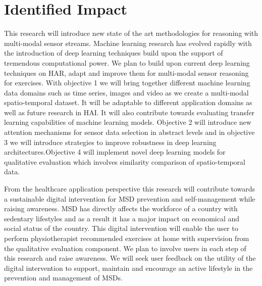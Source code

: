 \section{Identified Impact}

This research will introduce new state of the art methodologies for reasoning with multi-modal sensor streams. Machine learning research has evolved rapidly with the introduction of deep learning techniques build upon the support of tremendous computational power. We plan to build upon current deep learning techniques on HAR, adapt and improve them for multi-modal sensor reasoning for exercises. With objective 1 we will bring together different machine learning data domains such as time series, images and video as we create a multi-modal spatio-temporal dataset. It will be adaptable to different application domains as well as future research in HAI. It will also contribute towards evaluating transfer learning capabilities of machine learning models. Objective 2 will introduce new attention mechanisms for sensor data selection in abstract levels and in objective 3 we will introduce strategies to improve robustness in deep learning architectures.Objective 4 will implement novel deep learning models for qualitative evaluation which involves similarity comparison of spatio-temporal data. 

From the healthcare application perspective this research will contribute towards a sustainable digital intervention for MSD prevention and self-management while raising awareness. MSD has directly affects the workforce of a country with sedentary lifestyles and as a result it has a major impact on economical and social status of the country. This digital intervention will enable the user to perform physiotherapist recommended exercises at home with supervision from the qualitative evaluation component. We plan to involve users in each step of this research and raise awareness. We will seek user feedback on the utility of the digital intervention to support, maintain and encourage an active lifestyle in the prevention and management of MSDs.

